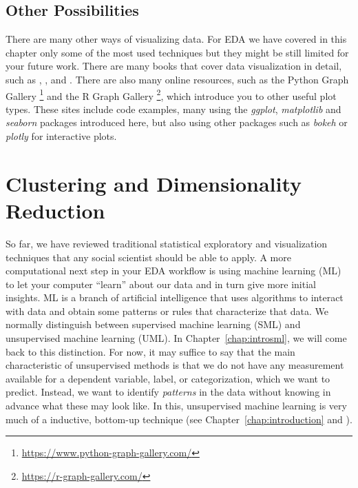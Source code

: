 



\subsection{Other Possibilities}\label{sec:plotother}

There are many other ways of visualizing data. For EDA we have covered in this chapter only some of the most used techniques but they might be still limited for your future work. There are many books that cover data visualization in detail, such as \cite{tufte2006beautiful}, \cite{cairo2019charts}, and \cite{Kirk2016}.  There are also many online resources, such as the Python Graph Gallery \footnote{\url{https://www.python-graph-gallery.com/}} and the R Graph Gallery \footnote{\url{https://r-graph-gallery.com/}}, which introduce you to other useful plot types.  These sites include code examples, many using the \emph{ggplot}, \emph{matplotlib} and \emph{seaborn} packages introduced here, but also using other packages such as \emph{bokeh} or \emph{plotly} for interactive plots.


%
\section{Clustering and Dimensionality Reduction}
\label{sec:clustering}

So far, we have reviewed traditional statistical exploratory and
visualization techniques that any social scientist should be able to apply. A more
computational next step in your EDA workflow is using machine learning
(ML) to let your computer ``learn'' about our data and in turn give 
more initial insights.  ML is a branch of artificial intelligence that
uses algorithms to interact with data and obtain some patterns or
rules that characterize that data. We normally distinguish between
supervised machine learning (SML) and unsupervised machine learning
(UML). In Chapter~\ref{chap:introsml}, we will come back to this distinction.
For now, it may suffice to say that the main characteristic of
unsupervised methods is that we do not have any measurement available
for a dependent variable, label, or categorization, which we want
to predict. Instead, we want to identify
\emph{patterns} in the data without knowing in advance what these may
look like. In this, unsupervised machine learning is very much of a
inductive, bottom-up technique (see Chapter~\ref{chap:introduction} and
\cite{Boumans2016}).


